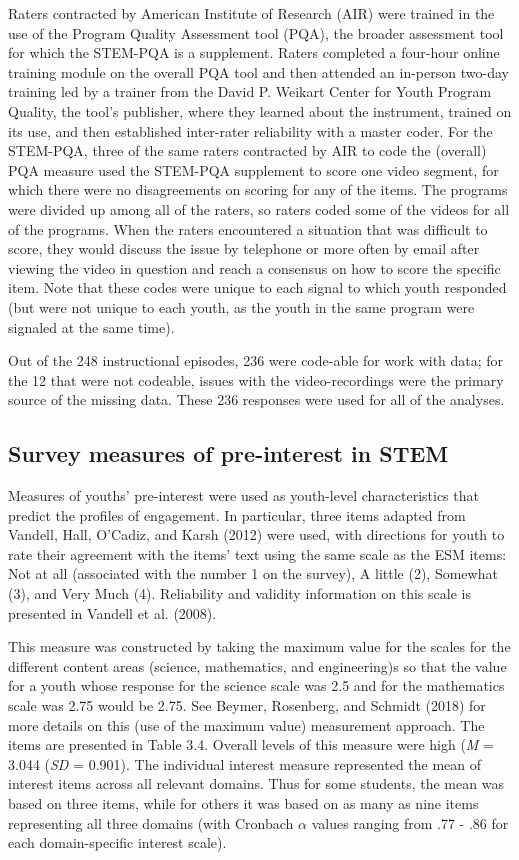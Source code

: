 \documentclass[]{book}
\theoremstyle{definition}
\theoremstyle{definition}
\theoremstyle{definition}
\theoremstyle{remark}
\begin{document}
Raters contracted by American Institute of Research (AIR) were trained
in the use of the Program Quality Assessment tool (PQA), the broader
assessment tool for which the STEM-PQA is a supplement. Raters completed
a four-hour online training module on the overall PQA tool and then
attended an in-person two-day training led by a trainer from the David
P. Weikart Center for Youth Program Quality, the tool's publisher, where
they learned about the instrument, trained on its use, and then
established inter-rater reliability with a master coder. For the
STEM-PQA, three of the same raters contracted by AIR to code the
(overall) PQA measure used the STEM-PQA supplement to score one video
segment, for which there were no disagreements on scoring for any of the
items. The programs were divided up among all of the raters, so raters
coded some of the videos for all of the programs. When the raters
encountered a situation that was difficult to score, they would discuss
the issue by telephone or more often by email after viewing the video in
question and reach a consensus on how to score the specific item. Note
that these codes were unique to each signal to which youth responded
(but were not unique to each youth, as the youth in the same program
were signaled at the same time).

Out of the 248 instructional episodes, 236 were code-able for work with
data; for the 12 that were not codeable, issues with the
video-recordings were the primary source of the missing data. These 236
responses were used for all of the analyses.

\subsection{Survey measures of pre-interest in
STEM}\label{survey-measures-of-pre-interest-in-stem}

Measures of youths' pre-interest were used as youth-level
characteristics that predict the profiles of engagement. In particular,
three items adapted from Vandell, Hall, O'Cadiz, and Karsh (2012) were
used, with directions for youth to rate their agreement with the items'
text using the same scale as the ESM items: Not at all (associated with
the number 1 on the survey), A little (2), Somewhat (3), and Very Much
(4). Reliability and validity information on this scale is presented in
Vandell et al. (2008).

This measure was constructed by taking the maximum value for the scales
for the different content areas (science, mathematics, and engineering)s
so that the value for a youth whose response for the science scale was
2.5 and for the mathematics scale was 2.75 would be 2.75. See Beymer,
Rosenberg, and Schmidt (2018) for more details on this (use of the
maximum value) measurement approach. The items are presented in Table
3.4. Overall levels of this measure were high (\emph{M} = 3.044
(\emph{SD} = 0.901). The individual interest measure represented the
mean of interest items across all relevant domains. Thus for some
students, the mean was based on three items, while for others it was
based on as many as nine items representing all three domains (with
Cronbach \(\alpha\) values ranging from .77 - .86 for each
domain-specific interest scale).
\end{document}
